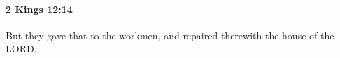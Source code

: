 
		\paragraph{2 Kings 12:14} %
			\label{2KINGS-12-14}

			But they gave that to the workmen, and repaired therewith the house of the LORD.



